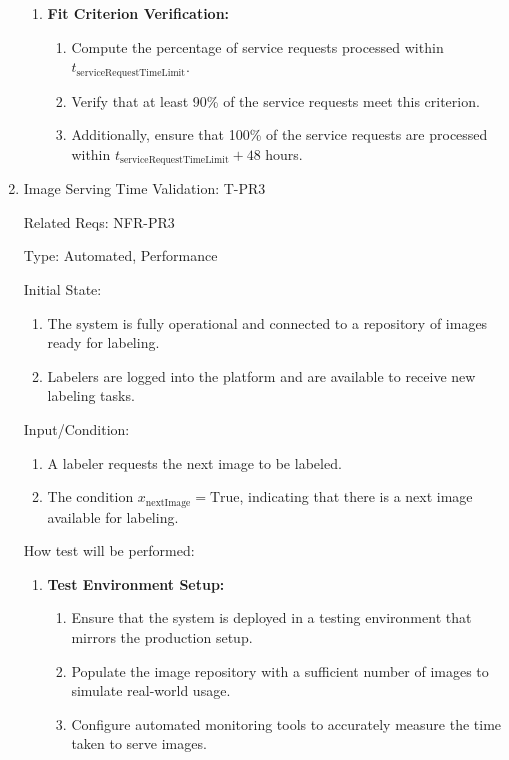 \documentclass[12pt, titlepage]{article}
\begin{document}
\begin{enumerate}
\begin{enumerate}
    \item \textbf{Fit Criterion Verification:}
    \begin{enumerate}
        \item Compute the percentage of service requests processed within $t_{\text{serviceRequestTimeLimit}}$.
        \item Verify that at least 90\% of the service requests meet this criterion.
        \item Additionally, ensure that 100\% of the service requests are processed within $t_{\text{serviceRequestTimeLimit}} + 48$ hours.
    \end{enumerate}
\end{enumerate}

\item{Image Serving Time Validation: T-PR3\\}

Related Reqs: NFR-PR3

Type: Automated, Performance

Initial State: 
\begin{enumerate}
    \item The system is fully operational and connected to a repository of images ready for labeling.
    \item Labelers are logged into the platform and are available to receive new labeling tasks.
\end{enumerate}
Input/Condition: 
\begin{enumerate}
    \item A labeler requests the next image to be labeled.
    \item The condition $x_{\text{nextImage}} = \text{True}$, indicating that there is a next image available for labeling.
\end{enumerate}
How test will be performed:
\begin{enumerate}
    \item \textbf{Test Environment Setup:}
    \begin{enumerate}
        \item Ensure that the system is deployed in a testing environment that mirrors the production setup.
        \item Populate the image repository with a sufficient number of images to simulate real-world usage.
        \item Configure automated monitoring tools to accurately measure the time taken to serve images.
    \end{enumerate}
    

\end{enumerate}
\end{enumerate}
\end{document}
